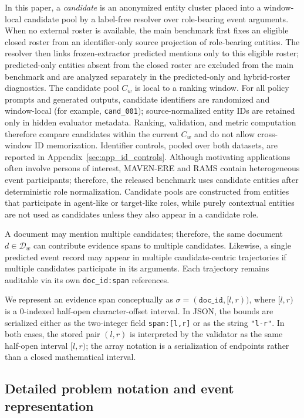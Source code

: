 \documentclass{article}
\begin{document}
In this paper, a \emph{candidate} is an anonymized entity cluster placed into a window-local candidate pool by a label-free resolver over role-bearing event arguments.
When no external roster is available, the main benchmark first fixes an eligible closed roster from an identifier-only source projection of role-bearing entities.
The resolver then links frozen-extractor predicted mentions only to this eligible roster; predicted-only entities absent from the closed roster are excluded from the main benchmark and are analyzed separately in the predicted-only and hybrid-roster diagnostics.
The candidate pool $C_w$ is local to a ranking window. For all policy prompts and generated outputs, candidate identifiers are randomized and window-local (for example, \texttt{cand\_001}); source-normalized entity IDs are retained only in hidden evaluator metadata.
Ranking, validation, and metric computation therefore compare candidates within the current $C_w$ and do not allow cross-window ID memorization.
Identifier controls, pooled over both datasets, are reported in Appendix~\ref{sec:app_id_controls}.
Although motivating applications often involve persons of interest, MAVEN-ERE and RAMS contain heterogeneous event participants; therefore, the released benchmark uses candidate entities after deterministic role normalization.
Candidate pools are constructed from entities that participate in agent-like or target-like roles, while purely contextual entities are not used as candidates unless they also appear in a candidate role.

A document may mention multiple candidates; therefore, the same document $d\in\mathcal{D}_w$ can contribute evidence spans to multiple candidates.
Likewise, a single predicted event record may appear in multiple candidate-centric trajectories if multiple candidates participate in its arguments.
Each trajectory remains auditable via its own \texttt{doc\_id:span} references.

We represent an evidence span conceptually as $\sigma=(\texttt{doc\_id},[l,r))$, where $[l,r)$ is a 0-indexed half-open character-offset interval.
In JSON, the bounds are serialized either as the two-integer field \texttt{span:[l,r]} or as the string \texttt{"l-r"}.
In both cases, the stored pair $(l,r)$ is interpreted by the validator as the same half-open interval $[l,r)$; the array notation is a serialization of endpoints rather than a closed mathematical interval.

\subsection{Detailed problem notation and event representation}
\label{sec:app_problem_details}
\end{document}
